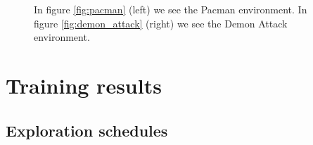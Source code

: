 \begin{figure}[!h] 
	\centering
	\hfill%
	\caption{In figure \ref{fig:pacman} (left) we see the Pacman environment. In figure \ref{fig:demon_attack} (right) we see the Demon Attack environment.}
	\label{fig:envs_to_test}
\end{figure}

\section{Training results}
\label{sec:env_setup}

\subsection{Exploration schedules}
\label{sec:eval_exp_schedules}

